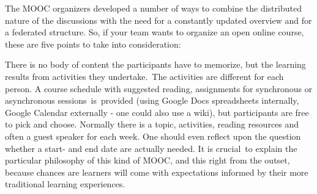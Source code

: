 The MOOC organizers developed a number of ways to combine the
distributed nature of the discussions with the need for a constantly
updated overview and for a federated structure. So, if your team wants
to organize an open online course, these are five points to take into
consideration:

There is no body of content the participants have to memorize, but the
learning results from activities they undertake.~The activities are
different for each person. A course schedule with suggested reading,
assignments for synchronous or asynchronous sessions~is~provided (using
Google Docs spreadsheets internally, Google Calendar externally - one
could also use a wiki), but participants are free to pick and choose.
Normally there is a topic, activities, reading resources and often a
guest speaker for each week. One should even reflect upon the question
whether a start- and end date are actually needed. It is crucial~to
explain the particular philosophy of this kind of MOOC, and this right
from the outset, because chances are learners will come with
expectations informed by their more traditional learning experiences.

